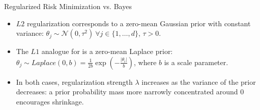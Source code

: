 \begin{vbframe} {Regularized Risk Minimization vs. Bayes}
\begin{itemize}
  \item $L2$ regularization corresponds to a zero-mean Gaussian prior with 
  constant variance:
  $\theta_j \sim \mathcal{N}(0, \tau^2) ~ \forall j \in \{1, \dots , d\}$, 
  $\tau > 0$.
  \item The $L1$ analogue for is a zero-mean Laplace prior: 
  $\theta_j \sim \mathit{Laplace}(0,b) = 
  \frac{1}{2b}\exp(-\frac{|\theta_i|}{b})$, where $b$ is a scale parameter.
  \item In both cases, regularization strength $\lambda$ increases as the 
  variance of the prior decreases: a prior probability mass more narrowly 
  concentrated around 0 encourages shrinkage.
\end{itemize}
  
\end{vbframe}


